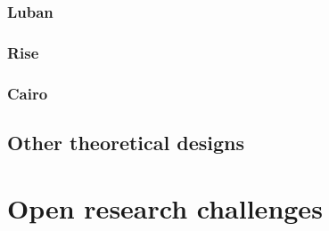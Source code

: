 \documentclass[a4paper]{article}
\theoremstyle{boldstyle}
\begin{document}
        \subsubsection{ \textbf{Luban}}
        
        \subsubsection{ \textbf{Rise}}
        
        \subsubsection{ \textbf{Cairo}}
        
        
                

\subsection{Other theoretical designs}

\section{Open research challenges} %
\end{document}
